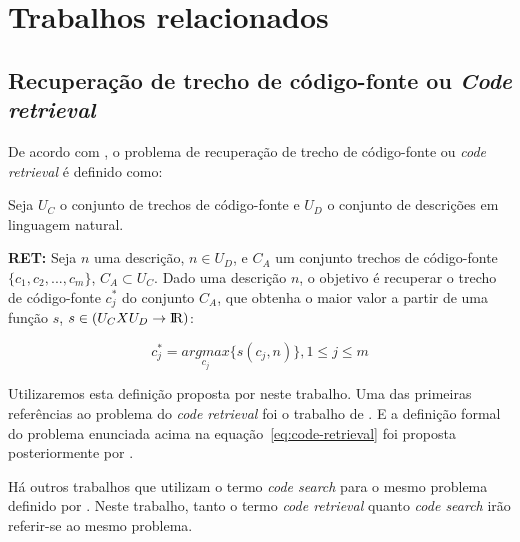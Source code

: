 \chapter{Trabalhos relacionados}
\label{cap:trabalhos-relacionados}



\section{Recuperação de trecho de código-fonte ou \textit{Code retrieval}}
\label{sec:code-retrieval}

De acordo com \cite{iyer-etal-2016-summarizing}, o problema de recuperação de trecho de código-fonte ou \textit{code retrieval} é definido como:

Seja $U_{C}$ o conjunto de trechos de código-fonte e $U_{D}$ o conjunto de descrições em linguagem natural. 

\textbf{RET:} Seja $n$ uma descrição, $n \in U_{D}$, e $C_{A}$ um conjunto trechos de código-fonte $\{c_{1}, c_{2}, ..., c_{m}\}$, $C_{A} \subset U_{C}$. Dado uma descrição $n$, o objetivo é recuperar o trecho de código-fonte $c_{j}^{*}$ do conjunto $C_{A}$, que obtenha o maior valor a partir de uma função $s$, $s \in (U_{C} X U_{D} \rightarrow \rm I\!R)$:

\begin{equation}\label{eq:code-retrieval}
c_{j}^{*} = \underset{c_{j}}{argmax} \{s(c_{j} , n)\}, 1 \leq j \leq m   
\end{equation}


Utilizaremos esta definição proposta por \cite{iyer-etal-2016-summarizing} neste trabalho. Uma das primeiras referências ao problema do \textit{code retrieval} foi o trabalho de \cite{Allamanis-bimodal-source-code-natural-language:2015}. E a definição formal do problema enunciada acima na equação~\ref{eq:code-retrieval} foi proposta posteriormente por \cite{iyer-etal-2016-summarizing}. 

Há outros trabalhos \citep{Gu-deep-code-search:2018, Sachdev-neural-code-search:2018, cambronero-deep-learning-code-search:2019} que utilizam o termo \textit{code search} para o mesmo problema definido por \cite{iyer-etal-2016-summarizing}. Neste trabalho, tanto o termo \textit{code retrieval} quanto \textit{code search} irão referir-se ao mesmo problema.




